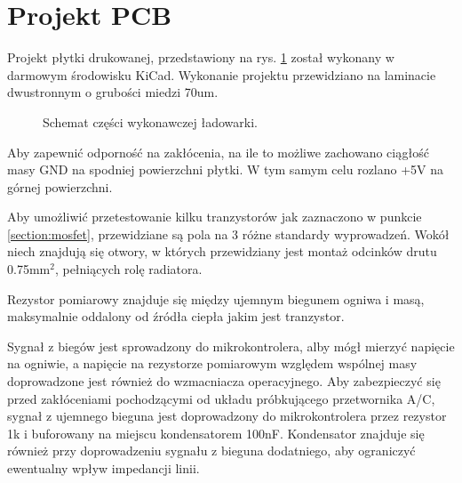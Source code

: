 \documentclass[polish,engineer]{polsl-msth}
\begin{document}
\section{Projekt PCB}
Projekt płytki drukowanej, przedstawiony na rys. \ref{img:pcb_colored} został wykonany w darmowym środowisku KiCad. Wykonanie projektu przewidziano na laminacie dwustronnym o grubości miedzi 70um.

\begin{figure}[hbtp]
     \caption{Schemat części wykonawczej ładowarki. \label{img:pcb_colored}}
\end{figure}

Aby zapewnić odporność na zakłócenia, na ile to możliwe zachowano ciągłość masy GND na spodniej powierzchni płytki. W tym samym celu rozlano +5V na górnej powierzchni. 

Aby umożliwić przetestowanie kilku tranzystorów jak zaznaczono w punkcie \ref{section:mosfet}, przewidziane są pola na 3 różne standardy wyprowadzeń. Wokół niech znajdują się otwory, w których przewidziany jest montaż odcinków drutu 0.75mm$^2$, pełniących rolę radiatora.

Rezystor pomiarowy znajduje się między ujemnym biegunem ogniwa i masą, maksymalnie oddalony od źródła ciepła jakim jest tranzystor. 

Sygnał z biegów jest sprowadzony do mikrokontrolera, alby mógł mierzyć napięcie na ogniwie, a napięcie na rezystorze pomiarowym względem wspólnej masy doprowadzone jest również do wzmacniacza operacyjnego. Aby zabezpieczyć się przed zakłóceniami pochodzącymi od układu próbkującego przetwornika A/C, sygnał z ujemnego bieguna jest doprowadzony do mikrokontrolera przez rezystor 1k i buforowany na miejscu kondensatorem 100nF. Kondensator znajduje się również przy doprowadzeniu sygnału z bieguna dodatniego, aby ograniczyć ewentualny wpływ impedancji linii.
\end{document}
